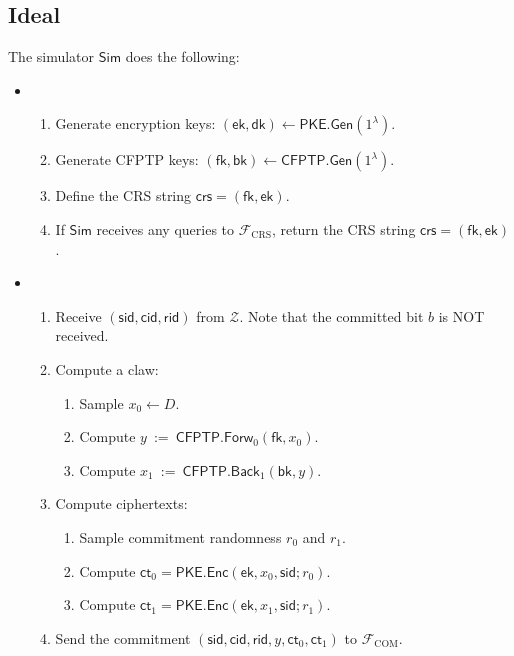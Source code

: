 \documentclass[11pt,letterpaper]{article}
\theoremstyle{plain} %
\theoremstyle{definition} %
\theoremstyle{remark} %
\newcommand{\eqdef}{\ {:=} \ }
\newcommand{\Input}{x}
\newcommand{\SecParam}{\lambda}
\newcommand{\PKE}{\mathsf{PKE}}
\newcommand{\Gen}{\mathsf{Gen}}
\newcommand{\Enc}{\mathsf{Enc}}
\newcommand{\EncKey}{\mathsf{ek}}
\newcommand{\DecKey}{\mathsf{dk}}
\newcommand{\Ct}{\mathsf{ct}}
\newcommand{\Rand}{r}
\newcommand{\CFPTP}{\mathsf{CFPTP}}
\newcommand{\Forw}{\mathsf{Forw}}
\newcommand{\Back}{\mathsf{Back}}
\newcommand{\ForwKey}{\mathsf{fk}}
\newcommand{\BackKey}{\mathsf{bk}}
\newcommand{\Domain}{D}
\newcommand{\Output}{y}
\newcommand{\Simulator}{{\mathsf{Sim}}} %
\newcommand{\Environment}{{\mathcal{Z}}} %
\newcommand{\IF}{\mathcal{F}} %
\newcommand{\sid}{\mathsf{sid}}
\newcommand{\CommitterId}{\mathsf{cid}}
\newcommand{\ReceiverId}{\mathsf{rid}}
\newcommand{\IFCrs}{\IF_{\mathrm{CRS}}}
\newcommand{\crs}{\mathsf{crs}}
\newcommand{\IFCom}{\IF_{\mathrm{COM}}}
\newcommand{\CommBit}{b}
\begin{document}
\subsection{Ideal}
\label{sec:ideal-distr}


The simulator $\Simulator$ does the following:
\begin{itemize}
\item \parhead{Simulate $\IFCrs$}
\begin{enumerate}[nolistsep]
    \item Generate encryption keys: $(\EncKey, \DecKey) \gets \PKE.\Gen(1^{\SecParam})$.
    \item Generate CFPTP keys: $(\ForwKey,\BackKey) \gets \CFPTP.\Gen(1^{\SecParam})$.
    \item Define the CRS string $\crs = (\ForwKey, \EncKey)$.
    \item If $\Simulator$ receives any queries to $\IFCrs$, return the CRS string $\crs = (\ForwKey, \EncKey)$.
\end{enumerate}

\item {}
\begin{enumerate}[nolistsep]
	\item Receive $(\sid, \CommitterId, \ReceiverId)$ from $\Environment$. Note that the committed bit $\CommBit$ is NOT received.
    \item Compute a claw:
    \begin{enumerate}[nolistsep]
        \item Sample $\Input_0\gets\Domain$.
        \item Compute $\Output \eqdef \CFPTP.\Forw_{0}(\ForwKey,\Input_0)$.
        \item Compute $\Input_1 \eqdef \CFPTP.\Back_{1}(\BackKey,\Output)$.
    \end{enumerate}
    \item Compute ciphertexts:
    \begin{enumerate}[nolistsep]
        \item Sample commitment randomness $\Rand_{0}$ and $\Rand_{1}$.
    	\item Compute $\Ct_{0} = \PKE.\Enc(\EncKey,\Input_{0}, \sid; \Rand_{0})$.
    	\item Compute $\Ct_{1} = \PKE.\Enc(\EncKey,\Input_{1}, \sid; \Rand_{1})$.
    \end{enumerate}
	\item Send the commitment $(\sid,\CommitterId,\ReceiverId,\Output, \Ct_0, \Ct_1)$ to $\IFCom$.
\end{enumerate}


\end{itemize}
\end{document}
